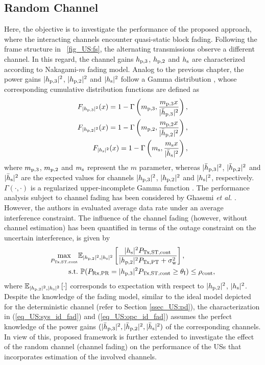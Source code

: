 \subsection{Random Channel}\label{ssec_US:ltpa}
Here, the objective is to investigate the performance of the proposed approach, where the interacting channels encounter quasi-static block fading. Following the frame structure in \figurename~\ref{fig_US:fs}, the alternating transmissions observe a different channel. In this regard, the channel gains $h_{\text{p,3}}$, $h_{\text{p,2}}$ and $h_{\text{s}}$ are characterized according to Nakagami-$m$ fading model. Analog to the previous chapter, the power gains $|h_{\text{p,3}}|^2$, $|h_{\text{p,2}}|^2$ and $|h_{\text{s}}|^2$ follow a Gamma distribution \cite{Goldsmith05}, whose corresponding cumulative distribution functions are defined as  
\begin{align}
F_{|h_{\text{p,3}}|^2}(x) = 1 - \Gamma\left(m_{\text{p,3}}, \frac{m_{\text{p,3}} x}{|\bar{h}_{\text{p,3}}|^2}\right), \label{eq_US:dis_pgpth}\\
F_{|h_{\text{p,2}}|^2}(x) = 1 - \Gamma\left(m_{\text{p,2}}, \frac{m_{\text{p,2}} x}{|\bar{h}_{\text{p,2}}|^2}\right), \label{eq_US:dis_pgpt}\\  
F_{|h_{\text{s}}|^2}(x) = 1 - \Gamma\left(m_{\text{s}} , \frac{m_{\text{s}} x}{|\bar{h}_{\text{s}}|^2}\right), \label{eq_US:dis_pgs}
\end{align}
where $m_{\text{p,3}}$, $m_{\text{p,2}}$ and $m_{\text{s}}$ represent the $m$ parameter, whereas $|\bar{h}_{\text{p,3}}|^2$, $|\bar{h}_{\text{p,2}}|^2$ and $|\bar{h}_{\text{s}}|^2$ are the expected values for channels $|h_{\text{p,3}}|^2$, $|h_{\text{p,2}}|^2$ and $|h_{\text{s}}|^2$, respectively. $\Gamma(\cdot, \cdot)$ is a regularized upper-incomplete Gamma function \cite{abramo}.
The performance analysis subject to channel fading has been considered by Ghasemi \textit{et al.} \cite{Ghasemi06, Ghasemi07}. However, the authors in \cite{Ghasemi06, Ghasemi07} evaluated average data rate under an average interference constraint. The influence of the channel fading (however, without channel estimation) has been quantified in terms of the outage constraint on the uncertain interference, is given by %
\begin{align}
	\max_{P_{\text{Tx,ST,cont}}} & {\mathbb E}_{|h_{\text{p,2}}|^2, |h_{\text{s}}|^2 }\left[  \frac{|h_{\text{s}}|^2 P_{\text{Tx,ST,cont}}}{|h_{\text{p,2}}|^2 P_{\text{Tx,PT}} + \sigma^2_{\text{w}}} \right] \label{eq_US:sys_id_fad}, \\
	\text{s.t.} & \text{ } \mathbb P(P_{\text{Rx,PR}}= |h_{\text{p,3}}|^2 P_{\text{Tx,ST,cont}} \ge \theta_{\text{I}}) \le \rho_{\text{cont}}, \label{eq_US:opc_id_fad} 
\end{align}
where ${\mathbb E}_{|h_{\text{p,2}}|^2, |h_{\text{s}}|^2}\left[ \cdot \right]$ corresponds to expectation with respect to $|h_{\text{p,2}}|^2$, $|h_{\text{s}}|^2$.
Despite the knowledge of the fading model, similar to the ideal model depicted for the deterministic channel (refer to Section \ref{ssec_US:pd}), the characterization in (\ref{eq_US:sys_id_fad}) and (\ref{eq_US:opc_id_fad}) assumes the perfect knowledge of the power gains $(|\bar{h}_{\text{p,3}}|^2, |\bar{h}_{\text{p,2}}|^2, |\bar{h}_{\text{s}}|^2)$ of the corresponding channels. In view of this, proposed framework is further extended to investigate the effect of the random channel (channel fading) on the performance of the USs that incorporates estimation of the involved channels.

